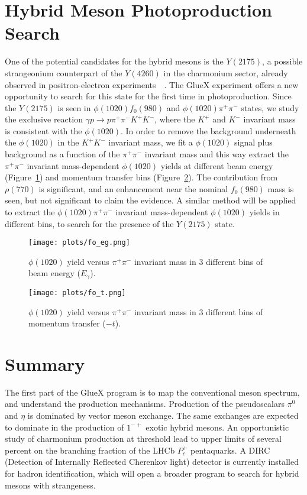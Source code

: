 \documentclass[a4paper]{jpconf}
\begin{document}
\section{Hybrid Meson Photoproduction Search}
One of the potential candidates for the hybrid mesons is the $Y(2175)$, a possible strangeonium counterpart of the $Y(4260)$ in the charmonium sector, already observed in positron-electron experiments~\cite{ref.6}~\cite{ref.7}. The GlueX experiment offers a new opportunity to search for this state for the first time in photoproduction. Since the $Y(2175)$ is seen in $\phi(1020)f_{0}(980)$ and $\phi(1020)\pi^{+}\pi^{-}$ states, we study the exclusive reaction $\gamma p \rightarrow p \pi^{+}\pi^{-}K^{+}K^{-}$, where the $K^{+}$ and $K^{-}$ invariant mass is consistent with the $\phi(1020)$. In order to remove the background underneath the $\phi(1020)$ in the $K^{+}K^{-}$ invariant mass, we fit a $\phi(1020)$ signal plus background as a function of the $\pi^{+}\pi^{-}$ invariant mass and this way extract the $\pi^{+}\pi^{-}$ invariant mass-dependent $\phi(1020)$ yields at different beam energy (Figure~\ref{fig.7}) and momentum transfer bins (Figure~\ref{fig.8}). The contribution from $\rho(770)$ is significant, and an enhancement near the nominal $f_{0}(980)$ mass is seen, but not significant to claim the evidence. A similar method will be applied to extract the $\phi(1020)\pi^{+}\pi^{-}$ invariant mass-dependent $\phi(1020)$ yields in different bins, to search for the presence of the $Y(2175)$ state.

\begin{figure}[h]
    \centering
    \texttt{[image: plots/fo\_eg.png]}
    \caption{\label{fig.7}$\phi(1020)$ yield versus $\pi^{+}\pi^{-}$ invariant mass in 3 different bins of beam energy ($E_{\gamma}$).}
\end{figure}

\begin{figure}[h]
    \centering
    \texttt{[image: plots/fo\_t.png]}
    \caption{\label{fig.8}$\phi(1020)$ yield versus $\pi^{+}\pi^{-}$ invariant mass in 3 different bins of momentum transfer ($-t$).}
\end{figure}

\section{Summary}
The first part of the GlueX program is to map the conventional meson spectrum, and understand the production mechanisms. Production of the pseudoscalars $\pi^{0}$ and $\eta$ is dominated by vector meson exchange. The same exchanges are expected to dominate in the production of $1^{-+}$ exotic hybrid mesons. An opportunistic study of charmonium production at threshold lead to upper limits of several percent on the branching fraction of the LHCb $P^{+}_{c}$ pentaquarks. A DIRC (Detection of Internally Reflected Cherenkov light) detector is currently installed for hadron identification, which will open a broader program to search for hybrid mesons with strangeness.
\end{document}
